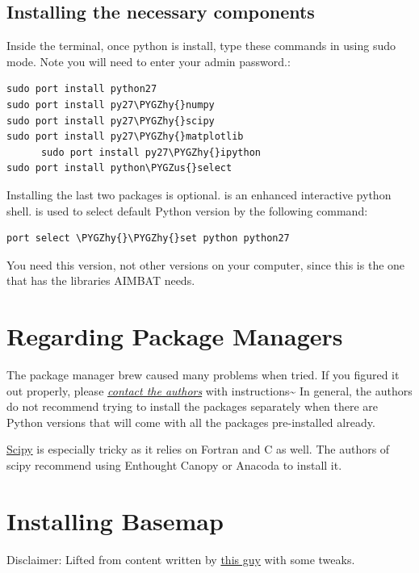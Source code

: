 \documentclass[letterpaper,10pt,english]{sphinxmanual}
\def\PYGZus{\char`\_}
\def\PYGZhy{\char`\-}
\begin{document}
\subsection{Installing the necessary components}
\label{docfiles/install_dependencies:installing-the-necessary-components}
Inside the terminal, once python is install, type these commands in using sudo mode. Note you will need to enter your admin password.:

\begin{Verbatim}[commandchars=\\\{\}]
      sudo port install python27
sudo port install py27\PYGZhy{}numpy
sudo port install py27\PYGZhy{}scipy
sudo port install py27\PYGZhy{}matplotlib
      sudo port install py27\PYGZhy{}ipython
sudo port install python\PYGZus{}select
\end{Verbatim}

Installing the last two packages is optional.  is an enhanced interactive python shell.  is used to select default Python version by the following command:

\begin{Verbatim}[commandchars=\\\{\}]
port select \PYGZhy{}\PYGZhy{}set python python27
\end{Verbatim}

You need this version, not other versions on your computer, since this is the one that has the libraries AIMBAT needs.


\section{Regarding Package Managers}
\label{docfiles/install_dependencies:regarding-package-managers}
The package manager brew caused many problems when tried. If you figured it out properly, please {\hyperref[docfiles/introduction:authors-contacts]{\emph{contact the authors}}} with instructions\textasciitilde{} In general, the authors do not recommend trying to install the packages separately when there are Python versions that will come with all the packages pre-installed already.

\href{http://www.scipy.org/install.html}{Scipy} is especially tricky as it relies on Fortran and C as well. The authors of scipy recommend using Enthought Canopy or Anacoda to install it.


\section{Installing Basemap}
\label{docfiles/install_dependencies:installing-basemap}
Disclaimer: Lifted from content written by \href{http://blog.bluedackers.com/2012/11/13/installing-basemap-on-mac-os-x-mountain-lion/}{this guy} with some tweaks.
\end{document}
